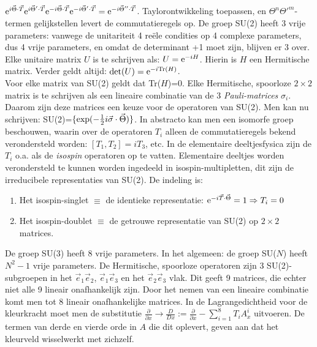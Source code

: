 \documentclass[twoside]{report}
\begin{document}
${\rm e}^{i\vec{\Theta}\cdot\vec{T}}{\rm e}^{i\vec{\Theta}'\cdot\vec{T}}{\rm e}^{-i\vec{\Theta}\cdot\vec{T}}
{\rm e}^{-i\vec{\Theta}'\cdot\vec{T}}={\rm e}^{-i\vec{\Theta}''\cdot\vec{T}}$.
Taylorontwikkeling toepassen, en $\Theta^n\Theta'^m$-termen gelijkstellen
levert de commutatieregels op.
\npar
De groep SU(2) heeft 3 vrije parameters: vanwege de unitariteit 4 re\"ele
condities op 4 complexe parameters, dus 4 vrije parameters, en omdat de
determinant +1 moet zijn, blijven er 3 over.
\npar
Elke unitaire matrix $U$ is te schrijven als: $U={\rm e}^{-iH}$. Hierin is $H$ een
Hermitische matrix. Verder geldt altijd: ${\rm det}(U)={\rm e}^{-i{\rm Tr}(H)}$.\\
Voor elke matrix van SU(2) geldt dat Tr($H$)=0. Elke Hermitische, spoorloze
$2\times2$ matrix is te schrijven als een lineaire combinatie van de 3
{\it Pauli-matrices} $\sigma_i$. Daarom zijn deze matrices een keuze voor de
operatoren van SU(2). Men kan nu schrijven:
SU(2)=$\{\exp(-\mbox{$\frac{1}{2}$} i\vec{\sigma}\cdot\vec{\Theta})\}$.
\npar
In abstracto kan men een isomorfe groep beschouwen, waarin over de
operatoren $T_i$ alleen de commutatieregels bekend verondersteld worden:
$[T_1,T_2]=iT_3$, etc.
\npar
In de elementaire deeltjesfysica zijn de $T_i$ o.a. als de {\it isospin}
operatoren op te vatten. Elementaire deeltjes worden verondersteld te kunnen
worden ingedeeld in isospin-multipletten, dit zijn de irreducibele
representaties van SU(2). De indeling is:
\begin{enumerate}
\item Het isospin-singlet $\equiv$ de identieke representatie: ${\rm e}^{-i\vec{T}\cdot\vec{\Theta}}=1\Rightarrow T_i=0$
\item Het isospin-doublet $\equiv$ de getrouwe representatie van SU(2) op $2\times2$ matrices.
\end{enumerate}
De groep SU(3) heeft 8 vrije parameters. In het algemeen: de groep SU($N$)
heeft $N^2-1$ vrije parameters. De Hermitische, spoorloze operatoren zijn 3
SU(2)-subgroepen in het $\vec{e}_1\vec{e}_2$, $\vec{e}_1\vec{e}_3$ en het
$\vec{e}_2\vec{e}_3$ vlak. Dit geeft 9 matrices, die echter niet alle 9
lineair onafhankelijk zijn. Door het nemen van een lineaire combinatie komt
men tot 8 lineair onafhankelijke matrices.
\npar
In de Lagrangedichtheid voor de kleurkracht moet men de substitutie
$\displaystyle\frac{\partial}{\partial x}\rightarrow\frac{D}{Dx}:=
\frac{\partial}{\partial x}-\sum_{i=1}^{8}T_iA^i_x$
\npar
uitvoeren. De termen van derde en vierde orde in $A$ die dit oplevert,
geven aan dat het kleurveld wisselwerkt met zichzelf.
\end{document}
